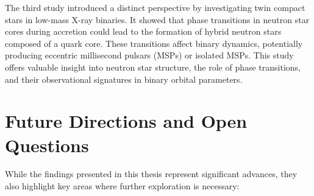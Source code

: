 \documentclass[main.tex]{subfiles}
\begin{document}
    The third study introduced a distinct perspective by investigating twin compact stars in low-mass X-ray binaries. It showed that phase transitions in neutron star cores during accretion could lead to the formation of hybrid neutron stars composed of a quark core. These transitions affect binary dynamics, potentially producing eccentric millisecond pulsars (MSPs) or isolated MSPs. This study offers valuable insight into neutron star structure, the role of phase transitions, and their observational signatures in binary orbital parameters.
    
    \section{Future Directions and Open Questions} \label{sec:ch5:future}
    While the findings presented in this thesis represent significant advances, they also highlight key areas where further exploration is necessary:
\end{document}
